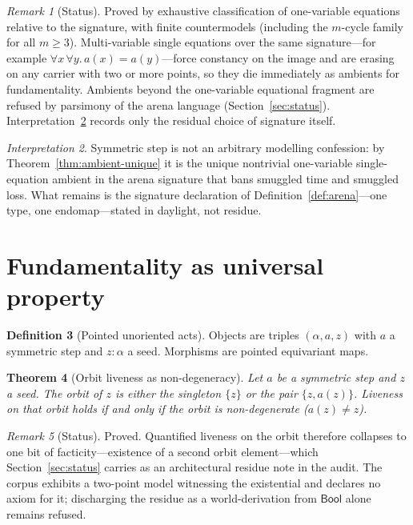 \documentclass[11pt,a4paper]{article}
\theoremstyle{plain}
\newtheorem{theorem}{Theorem}[section]
\theoremstyle{definition}
\newtheorem{definition}[theorem]{Definition}
\theoremstyle{remark}
\newtheorem{remark}[theorem]{Remark}
\newtheorem{interpretation}[theorem]{Interpretation}
\newcommand{\Bool}{\mathsf{Bool}}
\begin{document}
\begin{remark}[Status]
Proved by exhaustive classification of one-variable equations relative to
the signature, with finite countermodels (including the $m$-cycle family
for all $m\ge 3$). Multi-variable single equations over the same
signature---for example $\forall x\,\forall y.\,a(x)=a(y)$---force
constancy on the image and are erasing on any carrier with two or more
points, so they die immediately as ambients for fundamentality.
Ambients beyond the one-variable equational fragment are refused by
parsimony of the arena language (Section~\ref{sec:status}).
Interpretation~\ref{int:ambient} records only the residual choice of
signature itself.
\end{remark}

\begin{interpretation}
\label{int:ambient}
Symmetric step is not an arbitrary modelling confession: by
Theorem~\ref{thm:ambient-unique} it is the unique nontrivial
one-variable single-equation ambient in the arena signature that bans
smuggled time and smuggled loss. What remains is the signature
declaration of Definition~\ref{def:arena}---one type, one
endomap---stated in daylight, not residue.
\end{interpretation}


\section{Fundamentality as universal property}
\label{sec:fund}

\begin{definition}[Pointed unoriented acts]
\label{def:ambient}
Objects are triples $(\alpha,a,z)$ with $a$ a symmetric step and
$z:\alpha$ a seed. Morphisms are pointed equivariant maps.
\end{definition}

\begin{theorem}[Orbit liveness as non-degeneracy]
\label{thm:live-orbit}
Let $a$ be a symmetric step and $z$ a seed. The orbit of $z$ is either
the singleton $\{z\}$ or the pair $\{z,a(z)\}$. Liveness on that orbit
holds if and only if the orbit is non-degenerate ($a(z)\neq z$).
\end{theorem}

\begin{remark}[Status]
Proved. Quantified liveness on the orbit therefore collapses to one bit
of facticity---existence of a second orbit element---which
Section~\ref{sec:status} carries as an architectural residue note in the
audit. The corpus exhibits a two-point model witnessing the existential
and declares no axiom for it; discharging the residue as a
world-derivation from $\Bool$ alone remains refused.
\end{remark}
\end{document}
